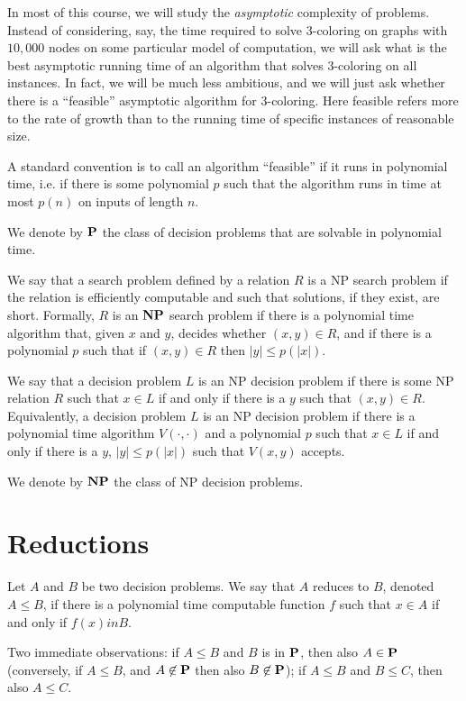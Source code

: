 In most of this course, we will study the {\em asymptotic} complexity
of problems. Instead of considering, say, the time required to
solve 3-coloring on graphs with $10,000$ nodes on some particular
model of computation, we will ask what is the best asymptotic
running time of an algorithm that solves 3-coloring on all
instances. In fact, we will be much less ambitious, and we will
just ask whether there is a ``feasible'' asymptotic algorithm
for 3-coloring. Here feasible refers more to the rate of growth
than to the running time of specific instances of reasonable size.

A standard convention is to call an algorithm ``feasible'' if
it runs in polynomial time, i.e. if there is some polynomial $p$
such that the algorithm runs in time at most $p(n)$ on inputs of
length $n$. 

We denote by $\p$ the class of decision problems that are
solvable in polynomial time.

We say that a search problem defined by a relation $R$ is a
NP search problem if the relation is efficiently computable
and such that solutions, if they exist, are short. Formally,
$R$ is an $\np$ search problem if there is a polynomial time
algorithm that, given $x$ and $y$, decides whether $(x,y)\in R$,
and if there is a polynomial $p$ such that if $(x,y)\in R$ then
$|y| \leq p(|x|)$.

We say that a decision problem $L$ is an NP decision problem
if there is some NP relation $R$ such that $x\in L$ if and
only if there is a $y$ such that $(x,y) \in R$. Equivalently,
a decision problem $L$ is an NP decision problem if
there is a polynomial time algorithm $V(\cdot,\cdot)$
and a polynomial $p$ such that $x\in L$ if and only if
there is a $y$, $|y| \leq p(|x|)$ such that $V(x,y)$ accepts.

We denote by $\np$ the class of NP decision problems.

\section*{Reductions}

Let $A$ and $B$ be two decision problems. We say that $A$ reduces
to $B$, denoted $A \leq B$, if there is a polynomial time computable
function $f$ such that $x\in A$ if and only if $f(x) in B$.

Two immediate observations: if $A\leq B$ and $B$ is in $\p$, 
then also $A\in \p$ (conversely, if $A\leq B$, and $A\not\in \p$
then also $B\not\in \p$); if $A\leq B$ and $B\leq C$, then
also $A\leq C$.


